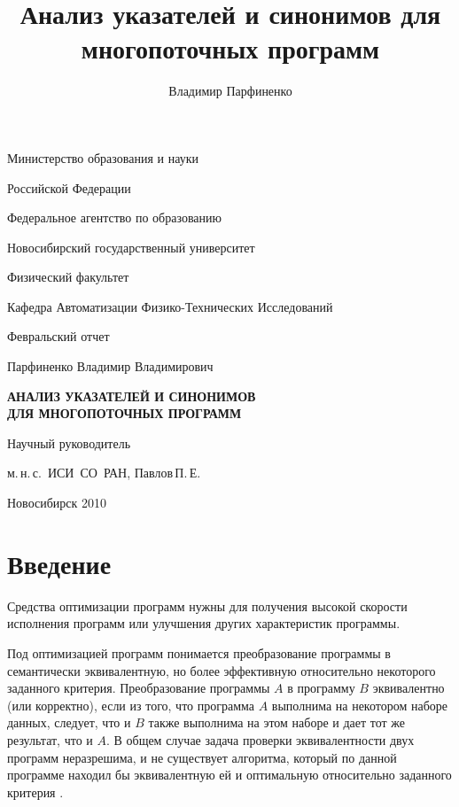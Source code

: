 \documentclass[14pt,titlepage]{extarticle}
\title{
  Анализ указателей и синонимов для многопоточных программ
}
\author{
  Владимир Парфиненко
}
\begin{document}
  \thispagestyle{empty}
  \begin {center}
    Министерство образования и науки

    Российской Федерации

    Федеральное агентство по образованию

    \vspace{0.3cm}

    Новосибирский государственный университет

    \vspace{0.3cm}

    Физический факультет

    Кафедра Автоматизации Физико-Технических Исследований

    \vspace {40mm}

    Февральский отчет

    \vspace {10mm}

    Парфиненко Владимир Владимирович

    \vspace {5mm}

    \textbf{АНАЛИЗ УКАЗАТЕЛЕЙ И СИНОНИМОВ\\ ДЛЯ МНОГОПОТОЧНЫХ ПРОГРАММ}

    \vspace {20mm}

    {\raggedleft

    Научный руководитель

    м.\,н.\,с.~ИСИ~СО~РАН, Павлов\,П.\,Е.

    \vspace {50mm}

    Новосибирск 2010}
  \end {center}


  \tableofcontents

  \newpage
  \section{Введение}

    Средства оптимизации программ нужны для получения высокой
    скорости исполнения программ или улучшения других характеристик программы.

    Под оптимизацией программ понимается преобразование программы в
    семантически эквивалентную, но более эффективную относительно некоторого
    заданного критерия.
    Преобразование программы $A$ в программу $B$ эквивалентно (или корректно),
    если из того, что программа $A$ выполнима на некотором наборе данных,
    следует, что и $B$ также выполнима на этом наборе и дает тот же результат,
    что и $A$.
    В общем случае задача проверки эквивалентности двух программ неразрешима,
    и не существует алгоритма, который по данной программе находил бы
    эквивалентную ей и оптимальную относительно заданного критерия
    \cite{kasjanov_translators}.
\end{document}
